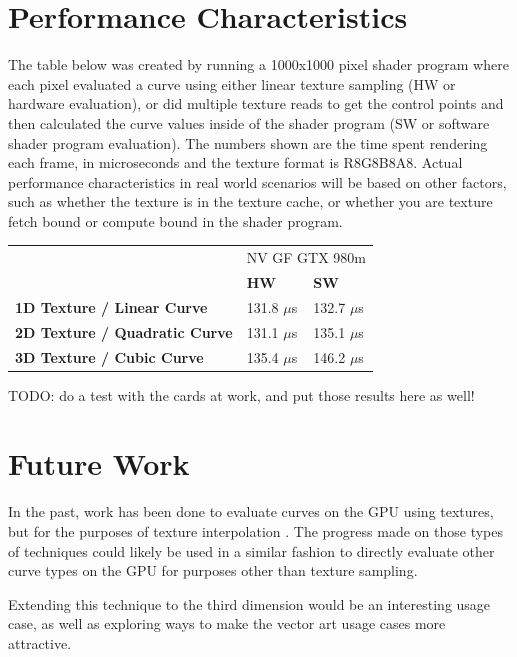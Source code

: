\documentclass{jcgt}
\begin{document}
\section{Performance Characteristics}
\label{sec:performancecharacteristics}

The table below was created by running a 1000x1000 pixel shader program where each pixel evaluated a curve using either linear texture sampling (HW or hardware evaluation), or did multiple texture reads to get the control points and then calculated the curve values inside of the shader program (SW or software shader program evaluation).  The numbers shown are the time spent rendering each frame, in microseconds and the texture format is R8G8B8A8.  Actual performance characteristics in real world scenarios will be based on other factors, such as whether the texture is in the texture cache, or whether you are texture fetch bound or compute bound in the shader program.

\begin{tabular}{|l|l l|}
\hline
& \multicolumn{2}{|c|}{NV GF GTX 980m} \\
& \bf{HW} & \bf{SW}\\ \hline
\bf{1D Texture / Linear Curve} & 131.8 $\mu$s & 132.7 $\mu$s \\ \hline
\bf{2D Texture / Quadratic Curve} & 131.1 $\mu$s & 135.1 $\mu$s \\ \hline
\bf{3D Texture / Cubic Curve} & 135.4 $\mu$s & 146.2 $\mu$s \\ \hline
\end{tabular}

TODO: do a test with the cards at work, and put those results here as well!

\section*{Future Work}
\label{sec:futurework}

In the past, work has been done to evaluate curves on the GPU using textures, but for the purposes of texture interpolation \cite{doi:10.1080/2151237X.2008.10129269}.  The progress made on those types of techniques could likely be used in a similar fashion to directly evaluate other curve types on the GPU for purposes other than texture sampling.

Extending this technique to the third dimension would be an interesting usage case, as well as exploring ways to make the vector art usage cases more attractive.
\end{document}
